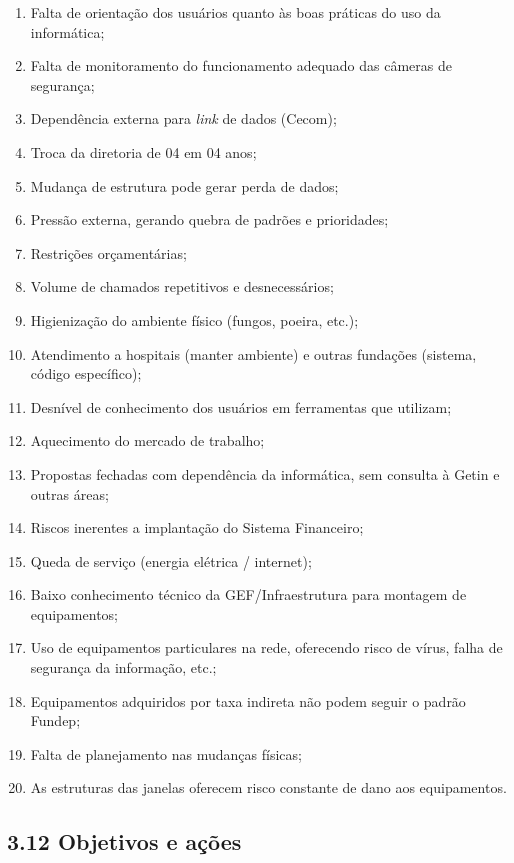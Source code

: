 \documentclass{article}
\begin{document}
\begin{enumerate}
    \item Falta de orientação dos usuários quanto às boas práticas do uso da informática;
    \item Falta de monitoramento do funcionamento adequado das câmeras de segurança;
    \item Dependência externa para \textit{link} de dados (Cecom);
    \item Troca da diretoria de 04 em 04 anos;
    \item Mudança de estrutura pode gerar perda de dados;
    \item Pressão externa, gerando quebra de padrões e prioridades;
    \item Restrições orçamentárias;
    \item Volume de chamados repetitivos e desnecessários;
    \item Higienização do ambiente físico (fungos, poeira, etc.);
    \item Atendimento a hospitais (manter ambiente) e outras fundações (sistema, código específico);
    \item Desnível de conhecimento dos usuários em ferramentas que utilizam;
    \item Aquecimento do mercado de trabalho;
    \item Propostas fechadas com dependência da informática, sem consulta à Getin e outras áreas;
    \item Riscos inerentes a implantação do Sistema Financeiro;
    \item Queda de serviço (energia elétrica / internet);
    \item Baixo conhecimento técnico da GEF/Infraestrutura para montagem de equipamentos;
    \item Uso de equipamentos particulares na rede, oferecendo risco de vírus, falha de segurança da informação, etc.;
    \item Equipamentos adquiridos por taxa indireta não podem seguir o padrão Fundep;
    \item Falta de planejamento nas mudanças físicas;
    \item As estruturas das janelas oferecem risco constante de dano aos equipamentos.
\end{enumerate}

\subsection*{3.12 Objetivos e ações}
\end{document}

